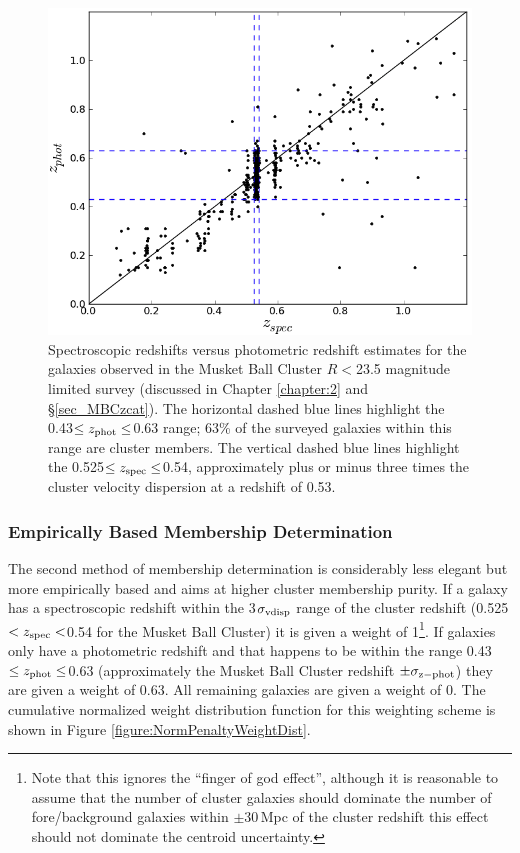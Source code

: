 \begin{figure}
\centering
\includegraphics[width=5in]{Chapter4/photVSspec.png}
\caption[Spectroscopic versus photometric redshift for the Musket Ball Cluster.]{
Spectroscopic redshifts versus photometric redshift estimates for the galaxies observed in the Musket Ball Cluster $R<$23.5 magnitude limited survey (discussed in Chapter \ref{chapter:2} and \S\ref{sec_MBCzcat}).
The horizontal dashed blue lines highlight the 0.43$\leq z_{\rm phot} \leq$0.63 range;
63\% of the surveyed galaxies within this range are cluster members.
The vertical dashed blue lines highlight the 0.525$\leq z_{\rm spec} \leq$0.54, approximately plus or minus three times the cluster velocity dispersion at a redshift of 0.53.
}
\label{figure:photzVSspecz}
\end{figure}



\subsubsection{Empirically Based Membership Determination}\label{section:EmpiricalWeightScheme}

The second method of membership determination is considerably less elegant but more empirically based and aims at higher cluster membership purity.
If a galaxy has a spectroscopic redshift within the 3$\sigma_{\rm vdisp}$ range of the cluster redshift (0.525$<z_{\rm spec}<$0.54 for the Musket Ball Cluster) it is given a weight of 1\footnote{
Note that this ignores the ``finger of god effect'', although it is reasonable to assume that the number of cluster galaxies should dominate the number of fore/background galaxies within $\pm$30\,Mpc of the cluster redshift this effect should not dominate the centroid uncertainty.}.
If galaxies only have a photometric redshift and that happens to be within the range 0.43$\leq z_{\rm phot} \leq$0.63 (approximately the Musket Ball Cluster redshift $\pm \sigma_{\rm z-phot}$) they are given a weight of 0.63.
All remaining galaxies are given a weight of 0.
The cumulative normalized weight distribution function for this weighting scheme is shown in Figure \ref{figure:NormPenaltyWeightDist}.

